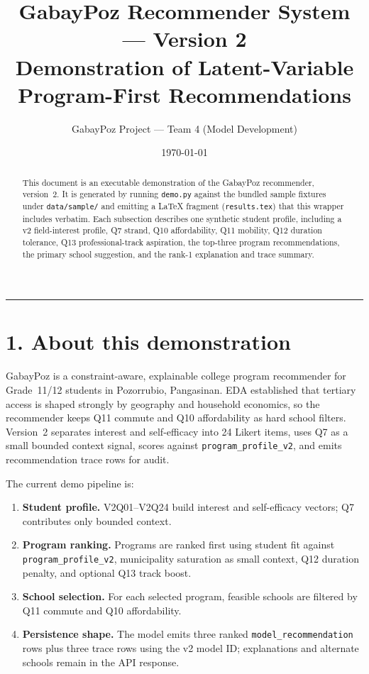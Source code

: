 \documentclass[11pt,a4paper]{article}
\title{\textbf{GabayPoz Recommender System --- Version 2}\\[0.4em]
       \large Demonstration of Latent-Variable Program-First Recommendations}
\author{GabayPoz Project --- Team 4 (Model Development)}
\date{\today}
\begin{document}
\maketitle

\begin{abstract}
\noindent
This document is an executable demonstration of the GabayPoz recommender,
version~2. It is generated by running \texttt{demo.py} against the bundled
sample fixtures under \texttt{data/sample/} and emitting a LaTeX fragment
(\texttt{results.tex}) that this wrapper includes verbatim. Each subsection
describes one synthetic student profile, including a v2 field-interest profile,
Q7 strand, Q10 affordability, Q11 mobility, Q12 duration tolerance, Q13
professional-track aspiration, the top-three program recommendations, the
primary school suggestion, and the rank-1 explanation and trace summary.
\end{abstract}

\vspace{0.5em}
\hrule
\vspace{0.5em}

\section*{1. About this demonstration}

GabayPoz is a constraint-aware, explainable college program recommender
for Grade~11/12 students in Pozorrubio, Pangasinan. EDA established that
tertiary access is shaped strongly by geography and household economics,
so the recommender keeps Q11 commute and Q10 affordability as hard school
filters. Version~2 separates interest and self-efficacy into 24 Likert items,
uses Q7 as a small bounded context signal, scores against
\texttt{program\_profile\_v2}, and emits recommendation trace rows for audit.

The current demo pipeline is:

\begin{enumerate}\setlength\itemsep{0.15em}
  \item \textbf{Student profile.} V2Q01--V2Q24 build interest and
        self-efficacy vectors; Q7 contributes only bounded context.
  \item \textbf{Program ranking.} Programs are ranked first using student
        fit against \texttt{program\_profile\_v2}, municipality saturation as
        small context, Q12 duration penalty, and optional Q13 track boost.
  \item \textbf{School selection.} For each selected program, feasible
        schools are filtered by Q11 commute and Q10 affordability.
  \item \textbf{Persistence shape.} The model emits three ranked
        \texttt{model\_recommendation} rows plus three trace rows using the
        v2 model ID; explanations and alternate schools remain in the API
        response.
\end{enumerate}
\end{document}
